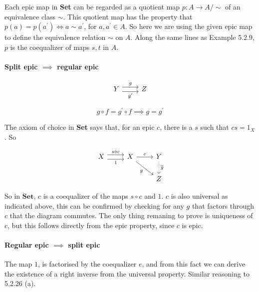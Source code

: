 \documentclass{article}
\begin{document}
Each epic map in \textbf{Set} can be regarded as a quotient map $p \colon A \rightarrow A/\sim$ of an equivalence class $\sim$. This quotient map has the property that $p(a) = p(a^\prime) \iff a \sim a^\prime$, for $a,a^\prime \in A$. So here we are using the given epic map to define the equivalence relation $\sim$ on $A$. Along the same lines as Example 5.2.9, $p$ is the coequalizer of maps $s,t$ in $A$.

\paragraph{Split epic $\implies$ regular epic}

\begin{equation*}
\label{eqn5143}
\begin{tikzcd}
 Y \ar[r,shift left=.75ex,"g"]
   \ar[r,shift right=.75ex,swap,"g^\prime"] & Z
\end{tikzcd}
\end{equation*}

\begin{equation*}
  g \circ f = g^\prime \circ f \implies g = g^\prime
\end{equation*}

The axiom of choice in \textbf{Set} says that, for an epic $c$, there is a $s$ such that  $cs = 1_X$. So

\begin{equation*}
\begin{tikzcd}
X \ar[r,shift left=.75ex,"s \circ c"]
  \ar[r,shift right=.75ex,swap,"1"]
&
X \ar[r,"c"] \ar[dr,swap,"g"]
&
Y \ar[d,densely dotted, "\overline{g}"]
\\
& & Z
\end{tikzcd}
\end{equation*}

So in $\mathbf{Set}$, $c$ is a coequalizer of the maps $s\circ c$ and $1$. $c$ is also universal as indicated above, this can be confirmed by checking for any $g$ that factors through $c$ that the diagram commutes. The only thing remaning to prove is uniqueness of $c$, but this follows directly from the epic property, since $c$ is epic.

\paragraph{Regular epic $\implies$ split epic}

The map $1$, is factorised by the coequalizer $e$, and from this fact we can derive the existence of a right inverse from the universal property. Similar reasoning to 5.2.26 (a).
\end{document}
